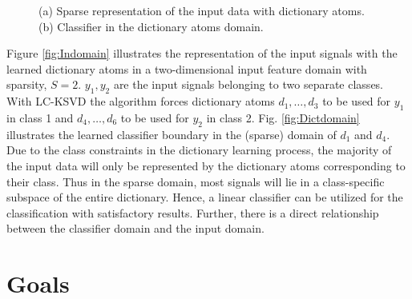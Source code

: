 \documentclass[11pt]{article}
\begin{document}
\begin{figure}
\begin{centering}
    \qquad
    
    \caption{(a) Sparse representation of the input data with dictionary atoms. (b) Classifier in the dictionary atoms domain.}
    \label{fig:image2}
\end{centering}
\end{figure}


Figure \ref{fig:Indomain} illustrates the representation of the input signals with the learned dictionary atoms in a two-dimensional input feature domain with sparsity, $S =2$. $y_1, y_2$ are the input signals belonging to two separate classes. With LC-KSVD the algorithm forces dictionary atoms $d_1, \dots , d_3$ to be used for $y_1$ in class 1 and $d_4, \dots , d_6$ to be used for $y_2$ in class 2. Fig. \ref{fig:Dictdomain} illustrates the learned classifier boundary in the (sparse) domain of $d_1$ and $d_4$. Due to the class constraints in the dictionary learning process, the majority of the input data will only be represented by the dictionary atoms corresponding to their class. Thus in the sparse domain, most signals will lie in a class-specific subspace of the entire dictionary. Hence, a linear classifier can be utilized for the classification with satisfactory results. Further, there is a direct relationship between the classifier domain and the input domain. 

\section{Goals}
\end{document}
